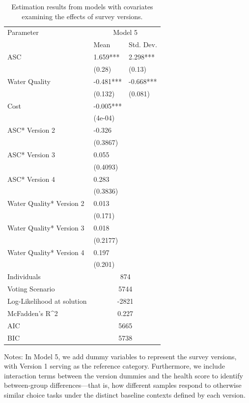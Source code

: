 {
\singlespacing
\renewcommand{\thetable}{3.3} %
\begin{table}[H]
\caption{Estimation results from models with covariates examining the effects of survey versions.}
\label{Table_5}
\begin{tabular}{p{6cm}p{3cm}p{1.5cm}}
  \midrule
Parameter & \multicolumn{2}{c}{Model 5} \\ 
 & Mean & Std. Dev.  \\ 
  \midrule
ASC & 1.659*** & 2.298*** \\ 
   & (0.28) & (0.13) \\ 
  Water Quality & -0.481*** & -0.668*** \\ 
   & (0.132) & (0.081) \\ 
  Cost & -0.005*** &  \\ 
   & (4e-04) &  \\ 
  ASC* Version 2 & -0.326 &  \\ 
   & (0.3867) &  \\ 
  ASC* Version 3 & 0.055 &  \\ 
   & (0.4093) &  \\ 
  ASC* Version 4 & 0.283 &  \\ 
   & (0.3836) &  \\ 
  Water Quality* Version 2 & 0.013 &  \\ 
   & (0.171) &  \\ 
  Water Quality* Version 3 & 0.018 &  \\ 
   & (0.2177) &  \\ 
  Water Quality* Version 4 & 0.197 &  \\ 
   & (0.201) &  \\ 
   \midrule
Individuals & \multicolumn{2}{c}{874} \\
Voting Scenario & \multicolumn{2}{c}{5744} \\
Log-Likelihood at solution  & \multicolumn{2}{c}{-2821} \\
McFadden's R^2 & \multicolumn{2}{c}{0.227} \\
AIC & \multicolumn{2}{c}{5665} \\
BIC & \multicolumn{2}{c}{5738} \\

  
   \midrule
\end{tabular}
\vspace{0.2em}

\small

Notes: In Model 5, we add dummy variables to represent the survey versions, with Version 1 serving as the reference category. Furthermore, we include interaction terms between the version dummies and the health score to identify between-group differences—that is, how different samples respond to otherwise similar choice tasks under the distinct baseline contexts defined by each version.


\end{table}
}